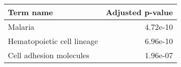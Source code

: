 \begin{tabular}{lr}
\toprule
                 Term name &  Adjusted p-value \\
\midrule
                   Malaria &          4.72e-10 \\
Hematopoietic cell lineage &          6.96e-10 \\
   Cell adhesion molecules &          1.96e-07 \\
\bottomrule
\end{tabular}
